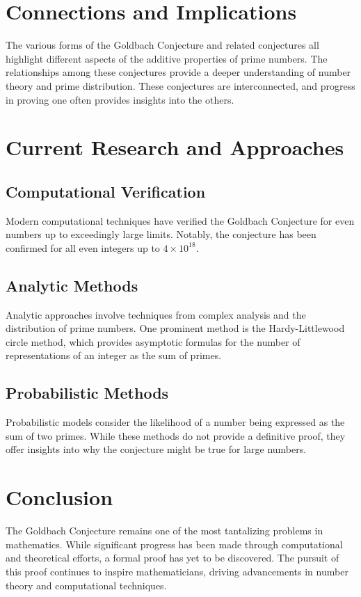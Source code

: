 \documentclass[a4paper, 12pt]{article}
\begin{document}
\section{Connections and Implications}
The various forms of the Goldbach Conjecture and related conjectures all highlight different aspects of the additive properties of prime numbers. The relationships among these conjectures provide a deeper understanding of number theory and prime distribution. These conjectures are interconnected, and progress in proving one often provides insights into the others.

\section{Current Research and Approaches}
\subsection{Computational Verification}
Modern computational techniques have verified the Goldbach Conjecture for even numbers up to exceedingly large limits. Notably, the conjecture has been confirmed for all even integers up to $4 \times 10^{18}$.

\subsection{Analytic Methods}
Analytic approaches involve techniques from complex analysis and the distribution of prime numbers. One prominent method is the Hardy-Littlewood circle method, which provides asymptotic formulas for the number of representations of an integer as the sum of primes.

\subsection{Probabilistic Methods}
Probabilistic models consider the likelihood of a number being expressed as the sum of two primes. While these methods do not provide a definitive proof, they offer insights into why the conjecture might be true for large numbers.

\section{Conclusion}
The Goldbach Conjecture remains one of the most tantalizing problems in mathematics. While significant progress has been made through computational and theoretical efforts, a formal proof has yet to be discovered. The pursuit of this proof continues to inspire mathematicians, driving advancements in number theory and computational techniques.
\end{document}
